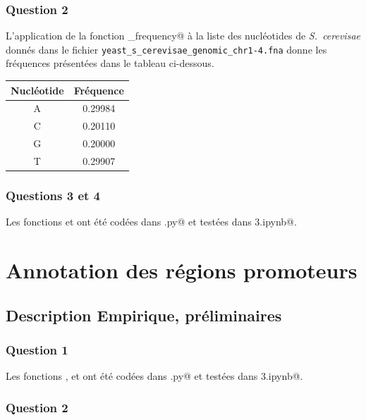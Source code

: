 \documentclass[a4paper,12pt]{article}
\begin{document}
\subsubsection*{Question 2}

L'application de la fonction \verb@nucleotide_frequency@ à la liste des nucléotides de \emph{S.\ cerevisae} donnés dans le fichier \texttt{yeast\_\allowbreak{}s\_\allowbreak{}cerevisae\_\allowbreak{}genomic\_\allowbreak{}chr1-4\allowbreak{}.fna} donne les fréquences présentées dans le tableau ci-dessous.

\begin{center}
\begin{tabular}{cc}
Nucléotide & Fréquence \tabularnewline
\hline
A & 0.29984 \tabularnewline
C & 0.20110 \tabularnewline
G & 0.20000 \tabularnewline
T & 0.29907 \tabularnewline
\end{tabular}
\end{center}

\subsubsection*{Questions 3 et 4}

Les fonctions \verb@logproba@ et \verb@logprobafast@ ont été codées dans \verb@projet.py@ et testées dans \verb@Projet3.ipynb@.

\section{Annotation des régions promoteurs}

\subsection{Description Empirique, préliminaires}

\subsubsection*{Question 1}

Les fonctions \verb@code@, \verb@inverse@ et \verb@comptage@ ont été codées dans \verb@projet.py@ et testées dans \verb@Projet3.ipynb@.

\subsubsection*{Question 2}
\end{document}
